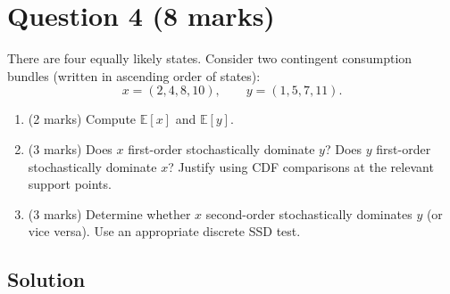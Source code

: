 \documentclass[12pt]{article}
\begin{document}
\bigskip

\section*{Question 4 (8 marks)}

There are four equally likely states. Consider two contingent consumption bundles (written in ascending order of states):
\[
x=(2,4,8,10),\qquad y=(1,5,7,11).
\]

\begin{enumerate}[label=(\alph*)]
\item (2 marks) Compute $\mathbb E[x]$ and $\mathbb E[y]$.
\item (3 marks) Does $x$ first-order stochastically dominate $y$? Does $y$ first-order stochastically dominate $x$? Justify using CDF comparisons at the relevant support points.
\item (3 marks) Determine whether $x$ second-order stochastically dominates $y$ (or vice versa). Use an appropriate discrete SSD test.
\end{enumerate}

\subsection*{Solution}
\end{document}
